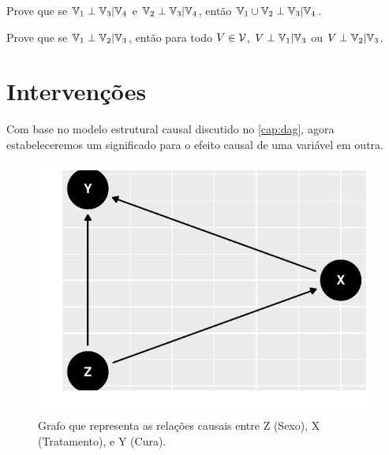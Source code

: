 \begin{exercise}
 Prove que se ${\mathbb V}_1 \perp {\mathbb V}_3 | {\mathbb V}_4$ e
 ${\mathbb V}_2 \perp {\mathbb V}_3 | {\mathbb V}_4$, então
 ${\mathbb V}_1 \cup {\mathbb V}_2 \perp {\mathbb V}_3 | {\mathbb V}_4$.
\end{exercise}

\begin{exercise}
 Prove que se ${\mathbb V}_1 \perp {\mathbb V}_2 | {\mathbb V}_3$, então
 para todo $V \in {\mathcal V}$, 
 $V \perp {\mathbb V}_1 | {\mathbb V}_3$ ou
 $V \perp {\mathbb V}_2 | {\mathbb V}_3$.
\end{exercise}

\chapter{Intervenções}
\label{cap:intervencao}

Com base no modelo estrutural causal discutido 
no \cref{cap:dag}, agora estabeleceremos
um significado para o efeito causal
de uma variável em outra. 

\begin{knitrout}
\color{fgcolor}\begin{figure}

{\centering \includegraphics[width=\maxwidth]{./figures/simpson_sexo-1} 

}

\caption[Grafo que representa as relações causais entre Z (Sexo), X (Tratamento), e Y (Cura)]{Grafo que representa as relações causais entre Z (Sexo), X (Tratamento), e Y (Cura).}\label{fig:simpson_sexo}
\end{figure}

\end{knitrout}

